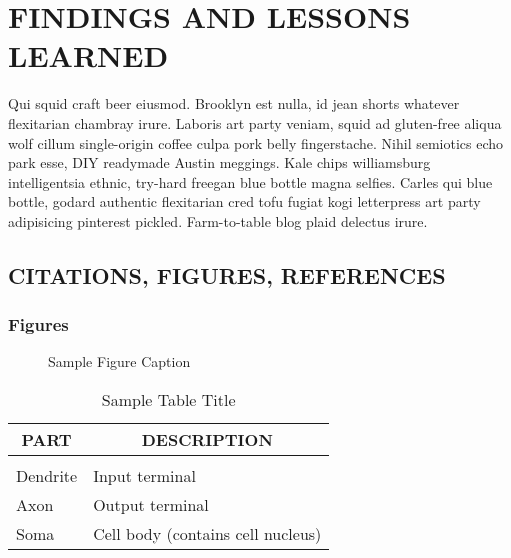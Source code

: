 \section{FINDINGS AND LESSONS LEARNED}
\label{sec:conclusion}

Qui squid craft beer eiusmod. Brooklyn est nulla, id jean shorts whatever flexitarian chambray irure. Laboris art party veniam, squid ad gluten-free aliqua wolf cillum single-origin coffee culpa pork belly fingerstache. Nihil semiotics echo park esse, DIY readymade Austin meggings. Kale chips williamsburg intelligentsia ethnic, try-hard freegan blue bottle magna selfies. Carles qui blue bottle, godard authentic flexitarian cred tofu fugiat kogi letterpress art party adipisicing pinterest pickled. Farm-to-table blog plaid delectus irure.




\subsection{CITATIONS, FIGURES, REFERENCES}

\subsubsection{Figures} 

\begin{figure}[h]
\vspace{1in}
\caption{Sample Figure Caption}
\end{figure}

\begin{table}[t]
\caption{Sample Table Title}
\label{sample-table}
\begin{center}
\begin{tabular}{ll}
\multicolumn{1}{c}{\bf PART}  &\multicolumn{1}{c}{\bf DESCRIPTION}
\\ \hline \\
Dendrite         &Input terminal \\
Axon             &Output terminal \\
Soma             &Cell body (contains cell nucleus) \\
\end{tabular}
\end{center}
\end{table}








